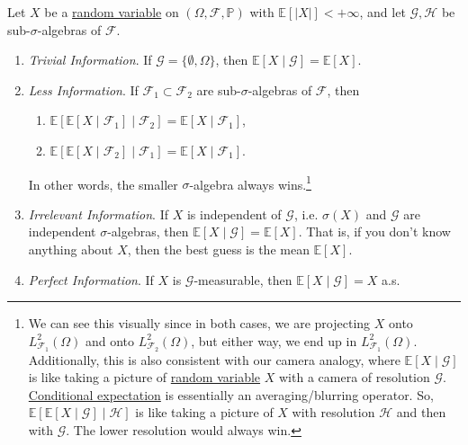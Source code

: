 	\begin{lemma}
	  \label{lem:conditioning-information}
	  Let $X$ be a \hyperref[def:random-variable]{random variable} on $(\Omega, \mathcal{F}, \mathbb{P})$ with $\mathbb{E}[|X|] < +\infty$, and let $\mathcal{G}, \mathcal{H}$ be sub-$\sigma$-algebras of $\mathcal{F}$. 
	  \begin{enumerate}
	    \item \label{ex:trivial-information} \textit{Trivial Information}. If $\mathcal{G} = \{\emptyset, \Omega\}$, then $\mathbb{E}[X \mid \mathcal{G}] = \mathbb{E}[X]$. 
	    \item \label{thm:less-information} \textit{Less Information}. If $\mathcal{F}_1 \subset \mathcal{F}_2$ are sub-$\sigma$-algebras of $\mathcal{F}$, then 
	    \begin{enumerate}
	      \item $\mathbb{E}[ \mathbb{E}[X \mid \mathcal{F}_1] \mid \mathcal{F}_2] = \mathbb{E}[X \mid \mathcal{F}_1]$, 
	      \item $\mathbb{E}[ \mathbb{E}[X \mid \mathcal{F}_2] \mid \mathcal{F}_1] = \mathbb{E}[X \mid \mathcal{F}_1]$. 
	    \end{enumerate}
			In other words, the smaller $\sigma$-algebra always wins.\footnote{We can see this visually since in both cases, we are projecting $X$ onto $L^2_{\mathcal{F}_1} (\Omega)$ and onto $L^2_{\mathcal{F}_2} (\Omega)$, but either way, we end up in $L^2_{\mathcal{F}_1} (\Omega)$. Additionally, this is also consistent with our camera analogy, where $\mathbb{E}[X \mid \mathcal{G}]$ is like taking a picture of \hyperref[def:random-variable]{random variable} $X$ with a camera of resolution $\mathcal{G}$. \hyperref[def:cond-exp]{Conditional expectation} is essentially an averaging/blurring operator. So, $\mathbb{E}[\mathbb{E}[X \mid \mathcal{G}] \mid \mathcal{H}]$ is like taking a picture of $X$ with resolution $\mathcal{H}$ and then with $\mathcal{G}$. The lower resolution would always win. } 
	    \item \label{ex:irrelevant-information} \textit{Irrelevant Information}. If $X$ is independent of $\mathcal{G}$, i.e. $\sigma(X)$ and $\mathcal{G}$ are independent $\sigma$-algebras, then $\mathbb{E}[X \mid \mathcal{G}] = \mathbb{E}[X]$. That is, if you don't know anything about $X$, then the best guess is the mean $\mathbb{E}[X]$. 
	    \item \label{thm:perfect-information} \textit{Perfect Information}. If $X$ is $\mathcal{G}$-measurable, then $\mathbb{E}[X \mid \mathcal{G}] = X$ a.s. 

\end{enumerate}
\end{lemma}
